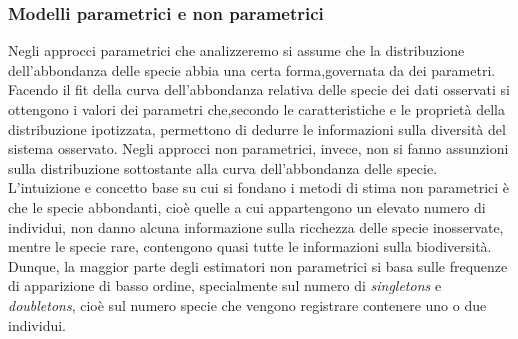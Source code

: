 \subsubsection{Modelli parametrici e non parametrici}
Negli approcci parametrici che analizzeremo si assume che la distribuzione dell'abbondanza delle specie abbia una certa forma,governata da dei parametri. Facendo il fit della curva dell'abbondanza relativa delle specie dei dati osservati si ottengono i valori dei parametri che,secondo le caratteristiche e le proprietà della distribuzione ipotizzata, permettono di dedurre le informazioni sulla diversità del sistema osservato.\newline
Negli approcci non parametrici, invece, non si fanno assunzioni sulla distribuzione sottostante alla curva dell'abbondanza delle specie. L'intuizione e concetto base su cui si fondano i metodi di stima non parametrici è che le specie abbondanti, cioè quelle a cui appartengono un elevato numero di individui, non danno alcuna informazione sulla ricchezza delle specie inosservate, mentre le specie rare, contengono quasi tutte le informazioni sulla biodiversità. Dunque, la maggior parte degli estimatori non parametrici si basa sulle frequenze di apparizione di basso ordine, specialmente sul numero di \emph{singletons} e \emph{doubletons}, cioè sul numero specie che vengono registrare contenere uno o due individui.

